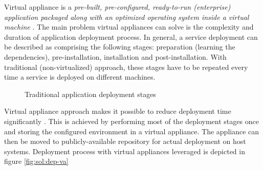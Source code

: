 \documentclass[11pt,openany]{book}
\begin{document}
        Virtual appliance is a \textit{pre-built, pre-configured, ready-to-run (enterprise) application packaged along
        with an optimized operating system inside a virtual machine} \cite{changhua}. The main problem virtual
        appliances can solve is the complexity and duration of application deployment process.  In general, a service
        deployment can be described as comprising the following stages: preparation (learning the dependencies),
        pre-installation, installation and post-installation. With traditional (non-virtualized) approach, these stages
        have to be repeated every time a service is deployed on different machines.

        \begin{figure}[H]
          \begin{center}
          \end{center}

          \caption{Traditional application deployment stages}
        \end{figure}

        Virtual appliance approach makes it possible to reduce deployment time significantly \cite{changhua}. This is
        achieved by performing most of the deployment stages once and storing the configured environment in a virtual
        appliance. The appliance can then be moved to publicly-available repository for actual deployment on host
        systems. Deployment process with virtual appliances leveraged is depicted in figure \ref{fig:sol:dep-va}
\end{document}
